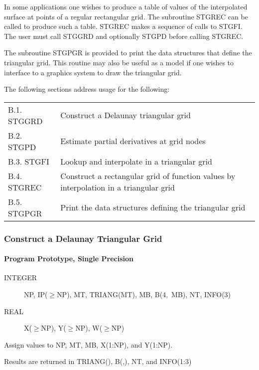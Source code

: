 \documentclass[twoside]{MATH77}
\begin{document}
In some applications one wishes to produce a table of values of the
interpolated surface at points of a regular rectangular grid.  The
subroutine STGREC can be called to produce such a table.  STGREC makes
a sequence of calls to STGFI.  The user must call STGGRD and optionally
STGPD before calling STGREC.

The subroutine STGPGR is provided to print the data structures that
define the triangular grid.  This routine may also be useful as a
model if one wishes to interface to a graphics system to draw the
triangular grid.

The following sections address usage for the following:

\begin{tabular}{lp{2.2in}}
B.1. STGGRD & Construct a Delaunay triangular grid\\
B.2. STGPD & Estimate partial derivatives at grid nodes\\
B.3. STGFI & Lookup and interpolate in a triangular grid\\
B.4. STGREC & Construct a rectangular grid of function values by
interpolation in a triangular grid\\
B.5. STGPGR & Print the data structures defining the triangular grid
\end{tabular}

\subsubsection{Construct a Delaunay Triangular Grid}

\paragraph{Program Prototype, Single Precision}

\begin{description}
\item[INTEGER] NP, IP($\geq$NP), MT, TRIANG(MT), MB, B(4,~MB), NT, INFO(3)
\item[REAL] X($\geq$NP), Y($\geq$NP), W($\geq$NP)
\end{description}
Assign values to NP, MT, MB, X(1:NP), and Y(1:NP).
\begin{center}
\end{center}
Results are returned in TRIANG(), B(,), NT, and INFO(1:3)
\end{document}

